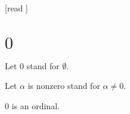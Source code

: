 \documentclass[10pt]{article}
\begin{document}
  \begin{imports}
    \begin{forthel}
      [read ]
    \end{forthel}
  \end{imports}


  \section*{$0$}

  \begin{forthel}
    Let $0$ stand for $\emptyset$.

    Let $\alpha$ is nonzero stand for $\alpha \neq 0$.
  \end{forthel}

  \begin{forthel}
    \begin{proposition}[id=SET_THEORY_02_8483196888940544,printid]
      $0$ is an ordinal.
    \end{proposition}
  \end{forthel}
\end{document}
